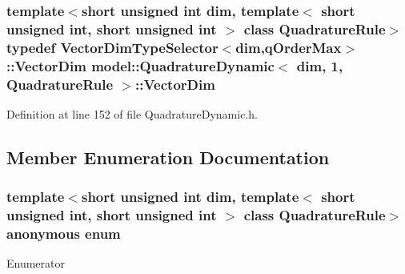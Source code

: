 \subsubsection[{Vector\+Dim}]{\setlength{\rightskip}{0pt plus 5cm}template$<$short unsigned int dim, template$<$ short unsigned int, short unsigned int $>$ class Quadrature\+Rule$>$ typedef {\bf Vector\+Dim\+Type\+Selector}$<${\bf dim},{\bf q\+Order\+Max}$>$\+::{\bf Vector\+Dim} {\bf model\+::\+Quadrature\+Dynamic}$<$ {\bf dim}, 1, Quadrature\+Rule $>$\+::{\bf Vector\+Dim}}\label{structmodel_1_1_quadrature_dynamic_3_01dim_00_011_00_01_quadrature_rule_01_4_a3efc5051d8d4eeceef8619ddd379ec2f}


Definition at line 152 of file Quadrature\+Dynamic.\+h.



\subsection{Member Enumeration Documentation}
\hypertarget{structmodel_1_1_quadrature_dynamic_3_01dim_00_011_00_01_quadrature_rule_01_4_a28357d85137133761eefc7f06b6e7117}{}\subsubsection[{anonymous enum}]{\setlength{\rightskip}{0pt plus 5cm}template$<$short unsigned int dim, template$<$ short unsigned int, short unsigned int $>$ class Quadrature\+Rule$>$ anonymous enum}\label{structmodel_1_1_quadrature_dynamic_3_01dim_00_011_00_01_quadrature_rule_01_4_a28357d85137133761eefc7f06b6e7117}
\begin{Desc}
\item[Enumerator]\par
\begin{description}
\item[{\em 
\hypertarget{structmodel_1_1_quadrature_dynamic_3_01dim_00_011_00_01_quadrature_rule_01_4_a28357d85137133761eefc7f06b6e7117ab0a5313cd23ea4952db4c8843dc43ab0}{}q\+Order\+Max\label{structmodel_1_1_quadrature_dynamic_3_01dim_00_011_00_01_quadrature_rule_01_4_a28357d85137133761eefc7f06b6e7117ab0a5313cd23ea4952db4c8843dc43ab0}
}]\end{description}
\end{Desc}


